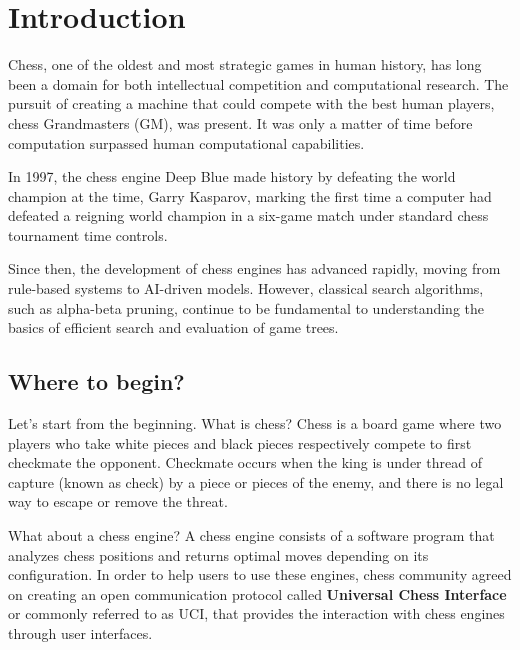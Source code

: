 \chapter{Introduction}
\label{cap:introduction}
\renewcommand{\figurename}{Figure}


Chess, one of the oldest and most strategic games in human history, has long been a domain for both intellectual competition and computational research. The pursuit of creating a machine that could compete with the best human players, chess Grandmasters (GM), was present. It was only a matter of time before computation surpassed human computational capabilities.

\vspace{1em}

\noindent In 1997, the chess engine Deep Blue made history by defeating the world champion at the time, Garry Kasparov, marking the first time a computer had defeated a reigning world champion in a six-game match under standard chess tournament time controls.

\vspace{1em}

\noindent Since then, the development of chess engines has advanced rapidly, moving from rule-based systems to AI-driven models. However, classical search algorithms, such as alpha-beta pruning, continue to be fundamental to understanding the basics of efficient search and evaluation of game trees.


\section{Where to begin?}

Let's start from the beginning. What is chess? Chess is a board game where two players who take white pieces and black pieces respectively compete to first checkmate the opponent. Checkmate occurs when the king is under thread of capture (known as check) by a piece or pieces of the enemy, and there is no legal way to escape or remove the threat.

\vspace{1em}

\noindent What about a chess engine? A chess engine consists of a software program that analyzes chess positions and returns optimal moves depending on its configuration. In order to help users to use these engines, chess community agreed on creating an open communication protocol called \textbf{Universal Chess Interface} or commonly referred to as UCI, that provides the interaction with chess engines through user interfaces.

